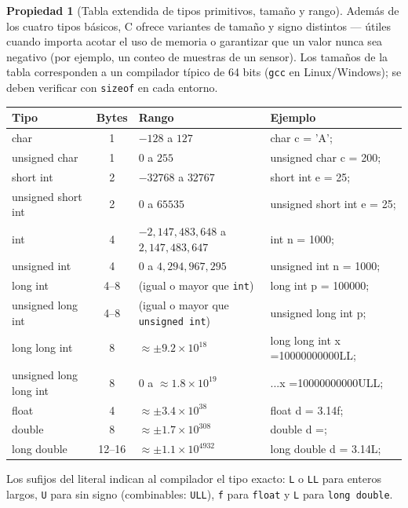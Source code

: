 \documentclass[11pt,letterpaper]{article}
\theoremstyle{definition}
\newtheorem{propiedad}[definicion]{Propiedad}
\begin{document}
\begin{propiedad}[Tabla extendida de tipos primitivos, tamaño y rango]
Además de los cuatro tipos básicos, C ofrece variantes de tamaño y signo distintos --- útiles
cuando importa acotar el uso de memoria o garantizar que un valor nunca sea negativo (por ejemplo,
un conteo de muestras de un sensor). Los tamaños de la tabla corresponden a un compilador típico de
64 bits (\texttt{gcc} en Linux/Windows); se deben verificar con \texttt{sizeof} en cada entorno.
\begin{center}
\small
\begin{tabular}{|>{\ttfamily}p{3.1cm}|c|p{4.2cm}|>{\ttfamily\small}p{4.6cm}|}
\hline
\normalfont\textbf{Tipo} & \normalfont\textbf{Bytes} & \normalfont\textbf{Rango} & \normalfont\textbf{Ejemplo} \\ \hline
char & 1 & $-128$ a $127$ & char c = 'A'; \\ \hline
unsigned char & 1 & $0$ a $255$ & unsigned char c = 200; \\ \hline
short int & 2 & $-32768$ a $32767$ & short int e = 25; \\ \hline
unsigned short int & 2 & $0$ a $65535$ & unsigned short int e = 25; \\ \hline
int & 4 & $-2{,}147{,}483{,}648$ a $2{,}147{,}483{,}647$ & int n = 1000; \\ \hline
unsigned int & 4 & $0$ a $4{,}294{,}967{,}295$ & unsigned int n = 1000; \\ \hline
long int & 4--8 & (igual o mayor que \normalfont\texttt{int}) & long int p = 100000; \\ \hline
unsigned long int & 4--8 & (igual o mayor que \normalfont\texttt{unsigned int}) & unsigned long int p; \\ \hline
long long int & 8 & $\approx \pm 9.2\times10^{18}$ & long long int x =\newline 10000000000LL; \\ \hline
unsigned long long int & 8 & $0$ a $\approx 1.8\times10^{19}$ & ...x =\newline 10000000000ULL; \\ \hline
float & 4 & $\approx \pm 3.4\times10^{38}$ & float d = 3.14f; \\ \hline
double & 8 & $\approx \pm 1.7\times10^{308}$ & double d =\newline 3.1415926535; \\ \hline
long double & 12--16 & $\approx \pm 1.1\times10^{4932}$ & long double d = 3.14L; \\ \hline
\end{tabular}
\end{center}
\normalsize
Los sufijos del literal indican al compilador el tipo exacto: \texttt{L} o \texttt{LL} para enteros
largos, \texttt{U} para sin signo (combinables: \texttt{ULL}), \texttt{f} para \texttt{float} y
\texttt{L} para \texttt{long double}.
\end{propiedad}
\end{document}
